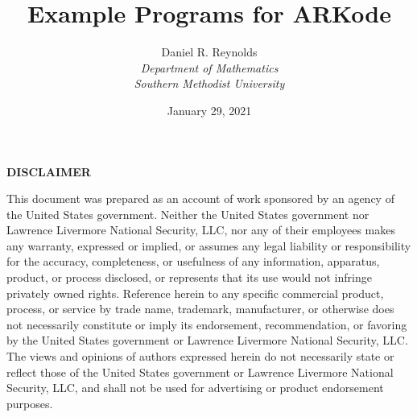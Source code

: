 \documentclass[letterpaper,10pt,english]{sphinxmanual}
\title{Example Programs for ARKode}
\date{January 29, 2021}
\author{
    Daniel R. Reynolds\\
    {\em Department of Mathematics} \\
    {\em Southern Methodist University}
    }
\newcommand{\sunreleasename}{v5.7.0}
\renewcommand{\releasename}{v4.7.0}
\begin{document}

\makeatletter



\makeatother

\clearpage

\thispagestyle{empty}%
\baselineskip
\begin{center}
  {\bf DISCLAIMER}
\end{center}
\noindent
This document was prepared as an account of work sponsored by an agency of
the United States government. Neither the United States government nor
Lawrence Livermore National Security, LLC, nor any of their employees makes
any warranty, expressed or implied, or assumes any legal liability or responsibility
for the accuracy, completeness, or usefulness of any information, apparatus, product,
or process disclosed, or represents that its use would not infringe privately owned rights.
Reference herein to any specific commercial product, process, or service by trade name,
trademark, manufacturer, or otherwise does not necessarily constitute or imply its endorsement,
recommendation, or favoring by the United States government or Lawrence Livermore National
Security, LLC. The views and opinions of authors expressed herein do not necessarily state
or reflect those of the United States government or Lawrence Livermore National Security, LLC,
and shall not be used for advertising or product endorsement purposes.
\end{document}
